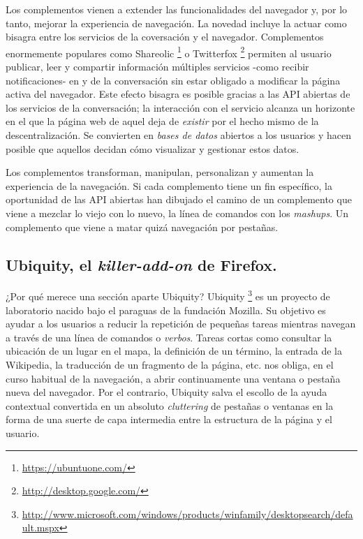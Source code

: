\documentclass[12pt, a4paper,twoside]{book}
\begin{document}
Los complementos vienen a extender las funcionalidades del
navegador y, por lo tanto, mejorar la experiencia de navegación. La
novedad incluye la actuar como bisagra entre los servicios de la
coversación y el navegador. Complementos enormemente populares como
Shareolic%
\footnote{\href{https://ubuntuone.com/}{https://ubuntuone.com/}}
o Twitterfox%
\footnote{\href{http://desktop.google.com/}{http://desktop.google.com/}}
permiten al usuario publicar, leer y compartir información
múltiples servicios -como recibir notificaciones- en y de la
conversación sin estar obligado a modificar la página activa del
navegador. Este efecto bisagra es posible gracias a las API
abiertas de los servicios de la conversación; la interacción con el
servicio alcanza un horizonte en el que la página web de aquel deja
de \emph{existir} por el hecho mismo de la descentralización. Se
convierten en \emph{bases de datos} abiertos a los usuarios y hacen
posible que aquellos decidan cómo visualizar y gestionar estos
datos.

Los complementos transforman, manipulan, personalizan y aumentan la
experiencia de la navegación. Si cada complemento tiene un fin
específico, la oportunidad de las API abiertas han dibujado el
camino de un complemento que viene a mezclar lo viejo con lo nuevo,
la línea de comandos con los \emph{mashups}. Un complemento que
viene a matar quizá navegación por pestañas.

\subsection{Ubiquity, el \emph{killer-add-on} de Firefox.}

¿Por qué merece una sección aparte Ubiquity? Ubiquity%
\footnote{\href{http://www.microsoft.com/windows/products/winfamily/desktopsearch/default.mspx}{http://www.microsoft.com/windows/products/winfamily/desktopsearch/default.mspx}}
es un proyecto de laboratorio nacido bajo el paraguas de la
fundación Mozilla. Su objetivo es ayudar a los usuarios a reducir
la repetición de pequeñas tareas mientras navegan a través de una
línea de comandos o \emph{verbos}. Tareas cortas como consultar la
ubicación de un lugar en el mapa, la definición de un término, la
entrada de la Wikipedia, la traducción de un fragmento de la
página, etc. nos obliga, en el curso habitual de la navegación, a
abrir continuamente una ventana o pestaña nueva del navegador. Por
el contrario, Ubiquity salva el escollo de la ayuda contextual
convertida en un absoluto \emph{cluttering} de pestañas o ventanas
en la forma de una suerte de capa intermedia entre la estructura de
la página y el usuario.
\end{document}
